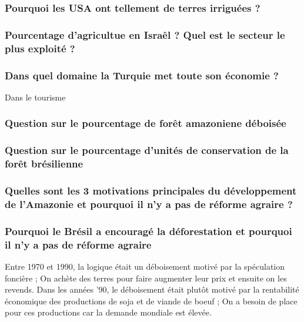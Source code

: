 \subsubsection{Pourquoi les USA ont tellement de terres irriguées ?}
\color{cyan}
\color{black}



\subsubsection{Pourcentage d'agricultue en Israêl ? Quel est le secteur le plus exploité ?}
\color{cyan}
\color{black}



\subsubsection{Dans quel domaine la Turquie met toute son économie ?}
\color{cyan}
Dans le tourisme
\color{black}



\subsubsection{Question sur le pourcentage de forêt amazoniene déboisée}
\color{cyan}
\color{black}



\subsubsection{Question sur le pourcentage d'unités de conservation de la forêt brésilienne}
\color{cyan}
\color{black}



\subsubsection{Quelles sont les 3 motivations principales du développement de l'Amazonie et pourquoi il n'y a pas de réforme agraire ?}
\color{cyan}
\color{black}



\subsubsection{Pourquoi le Brésil a encouragé la déforestation et pourquoi il n'y a pas de réforme agraire}
\color{cyan}
Entre 1970 et 1990, la logique était un déboisement motivé par la spéculation foncière ; On achète des terres pour faire augmenter leur prix et ensuite on les revends. Dans les années '90, le déboisement était plutôt motivé par la rentabilité économique des productions de soja et de viande de boeuf ; On a besoin de place pour ces productions car la demande mondiale est élevée.
\color{black}



